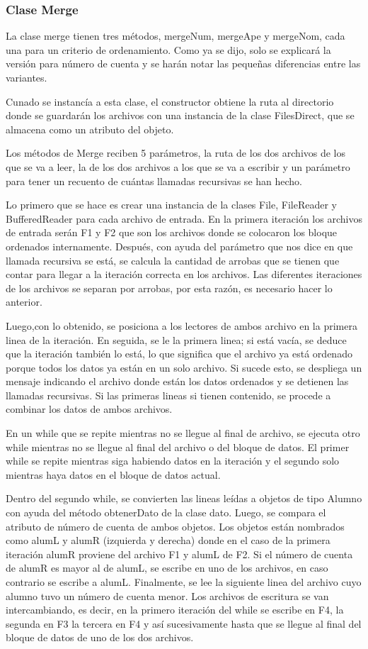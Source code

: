 \documentclass[11pt]{article}
\begin{document}
\subsubsection{Clase Merge}
La clase merge tienen tres métodos, mergeNum, mergeApe y mergeNom, cada una para un criterio de ordenamiento. Como ya se dijo, solo se explicará la versión para número de cuenta y se harán notar las pequeñas diferencias entre las variantes.
\par
Cunado se instancía a esta clase, el constructor obtiene la ruta al directorio donde se guardarán los archivos con una instancia de la clase FilesDirect, que se almacena como un atributo del objeto.
\par
Los métodos de Merge reciben 5 parámetros, la ruta de los dos archivos de los que se va a leer, la de los dos archivos a los que se va a escribir y un parámetro para tener un recuento de cuántas llamadas recursivas se han hecho. 
\par
Lo primero que se hace es crear una instancia de la clases File, FileReader y BufferedReader para cada archivo de entrada. En la primera iteración los archivos de entrada serán F1 y F2 que son los archivos donde se colocaron los bloque ordenados internamente. Después, con ayuda del parámetro que nos dice en 
que llamada recursiva se está, se calcula la cantidad de arrobas que se tienen que contar para llegar a la iteración correcta en los archivos. Las diferentes iteraciones de los archivos se separan por arrobas, por esta razón, es necesario hacer lo anterior.
\par
Luego,con lo obtenido, se posiciona a los lectores de ambos archivo en la primera linea de la iteración. En seguida, se le la primera linea; si está vacía, se deduce que la iteración también lo está, lo que significa que el archivo ya está ordenado porque todos los datos ya están en un solo archivo. Si sucede esto, se despliega un mensaje indicando el archivo donde están los datos ordenados y se detienen las llamadas recursivas. Si las primeras lineas si tienen contenido, se procede a combinar los datos de ambos archivos.
\par
En un while que se repite mientras no se llegue al final de archivo, se ejecuta otro while mientras no se llegue al final del archivo o del bloque de datos. El primer while se repite mientras siga habiendo datos en la iteración y el segundo solo mientras haya datos en el bloque de datos actual.
\par
Dentro del segundo while, se convierten las lineas leídas a objetos de tipo Alumno con ayuda del método obtenerDato de la clase dato. Luego, se compara el atributo de número de cuenta de ambos objetos. Los objetos están nombrados como alumL y alumR (izquierda y derecha) donde en el caso de la primera iteración alumR proviene del archivo F1 y alumL de F2. Si el número de cuenta de alumR es mayor al de alumL, se escribe en uno de los archivos, en caso contrario se escribe a alumL. Finalmente, se lee la siguiente linea del archivo cuyo alumno tuvo un número de cuenta menor. Los archivos de escritura se van intercambiando, es decir, en la primero iteración del while se escribe en F4, la segunda en F3 la tercera en F4 y así sucesivamente hasta que se llegue al final del bloque de datos de uno de los dos archivos.
\end{document}
